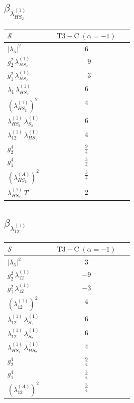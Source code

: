 \documentclass[9pt]{article}
\begin{document}
\subsection*{$ \beta_{\lambda_{HS_2}^{(1)}} $}
\begin{longtable}{@{}p{0.31\linewidth}c@{}}
\toprule
$\mathcal{S}$ & $ \mathrm{T3-C}\;(\alpha=-1) $ \\
\midrule
$ |\lambda_5|^2 $ & $ 6 $ \\
$ g_2^2\,\lambda_{HS_2}^{(1)} $ & $ -9 $ \\
$ g_1^2\,\lambda_{HS_2}^{(1)} $ & $ -3 $ \\
$ \lambda_1\,\lambda_{HS_2}^{(1)} $ & $ 6 $ \\
$ \left(\lambda_{HS_2}^{(1)}\right)^2 $ & $ 4 $ \\
$ \lambda_{HS_2}^{(1)}\,\lambda_{S_2}^{(1)} $ & $ 6 $ \\
$ \lambda_{12}^{(1)}\,\lambda_{HS_1}^{(1)} $ & $ 4 $ \\
$ g_2^4 $ & $ \frac{9}{4} $ \\
$ g_1^4 $ & $ \frac{3}{4} $ \\
$ \left(\lambda_{HS_2}^{(A)}\right)^2 $ & $ \frac{3}{4} $ \\
$ \lambda_{HS_2}^{(1)}\,T $ & $ 2 $ \\
\bottomrule
\end{longtable}
\subsection*{$ \beta_{\lambda_{12}^{(1)}} $}
\begin{longtable}{@{}p{0.31\linewidth}c@{}}
\toprule
$\mathcal{S}$ & $ \mathrm{T3-C}\;(\alpha=-1) $ \\
\midrule
$ |\lambda_5|^2 $ & $ 3 $ \\
$ g_2^2\,\lambda_{12}^{(1)} $ & $ -9 $ \\
$ g_1^2\,\lambda_{12}^{(1)} $ & $ -3 $ \\
$ \left(\lambda_{12}^{(1)}\right)^2 $ & $ 4 $ \\
$ \lambda_{12}^{(1)}\,\lambda_{S_1}^{(1)} $ & $ 6 $ \\
$ \lambda_{12}^{(1)}\,\lambda_{S_2}^{(1)} $ & $ 6 $ \\
$ \lambda_{HS_1}^{(1)}\,\lambda_{HS_2}^{(1)} $ & $ 4 $ \\
$ g_2^4 $ & $ \frac{9}{4} $ \\
$ g_1^4 $ & $ \frac{3}{4} $ \\
$ \left(\lambda_{12}^{(A)}\right)^2 $ & $ \frac{3}{4} $ \\
\bottomrule
\end{longtable}
\end{document}
